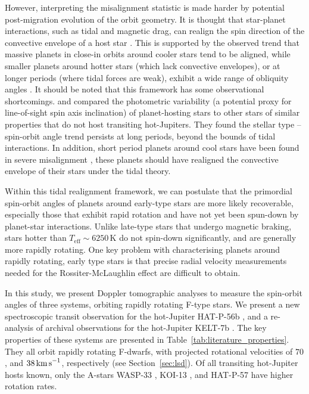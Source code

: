 \documentclass[useAMS,usenatbib]{mn2e}
\begin{document}
However, interpreting the misalignment statistic is made harder by potential post-migration evolution of the orbit geometry. It is thought that star-planet interactions, such as tidal and magnetic drag, can realign the spin direction of the convective envelope of a host star \citep{2010ApJ...718L.145W,2012MNRAS.423..486L,2013ApJ...769L..10R,2014ApJ...784...66X,2014ApJ...790L..31D}. This is supported by the observed trend that massive planets in close-in orbits around cooler stars tend to be aligned, while smaller planets around hotter stars (which lack convective envelopes), or at longer periods (where tidal forces are weak), exhibit a wide range of obliquity angles \citep[e.g.][]{2010ApJ...718L.145W,2010ApJ...719..602S,2012ApJ...757...18A,2015ApJ...801....3M}.  It should be noted that this framework has some observational shortcomings. \citet{2015ApJ...801....3M} and \citet{2015arXiv151105570L} compared the photometric variability (a potential proxy for line-of-sight spin axis inclination) of planet-hosting stars to other stars of similar properties that do not host transiting hot-Jupiters. They found the stellar type -- spin-orbit angle trend persists at long periods, beyond the bounds of tidal interactions. In addition, short period planets around cool stars have been found in severe misalignment \citep{2010MNRAS.402L...1P,2015ApJ...814L..16Z}, these planets should have realigned the convective envelope of their stars under the tidal theory.

Within this tidal realignment framework, we can postulate that the primordial spin-orbit angles of planets around early-type stars are more likely recoverable, especially those that exhibit rapid rotation and have not yet been spun-down by planet-star interactions. Unlike late-type stars that undergo magnetic braking, stars hotter than $T_\text{eff} \sim 6250\,\text{K}$ do not spin-down significantly, and are generally more rapidly rotating. One key problem with characterising planets around rapidly rotating, early type stars is that precise radial velocity measurements needed for the Rossiter-McLaughlin effect \citep{1924ApJ....60...15R,1924ApJ....60...22M} are difficult to obtain.

In this study, we present Doppler tomographic analyses to measure the spin-orbit angles of three systems, orbiting rapidly rotating F-type stars. We present a new spectroscopic transit observation for the hot-Jupiter HAT-P-56b \citep{2015AJ....150...85H}, and a re-analysis of archival observations for the hot-Jupiter KELT-7b \citep{2015AJ....150...12B}. The key properties of these systems are presented in Table~\ref{tab:literature_properties}. They all orbit rapidly rotating F-dwarfs, with projected rotational velocities of $70$, and $38\,\text{km\,s}^{-1}$, respectively (see Section~\ref{sec:lsd}). Of all transiting hot-Jupiter hosts known, only the A-stars WASP-33 \citep{2010MNRAS.407..507C}, KOI-13 \citep{2014ApJ...790...30J}, and HAT-P-57 \citep{2015AJ....150..197H} have higher rotation rates.
\end{document}
